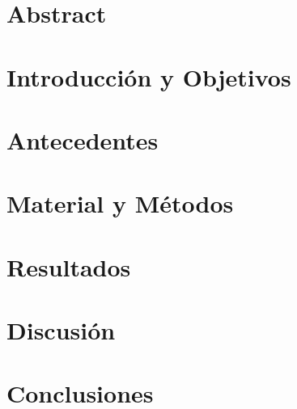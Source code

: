 \documentclass[b5paper,twoside,10pt]{book}
\begin{document}
\tableofcontents
\listoffigures
\listoftables
\clearpage



\mainmatter

\pagestyle{fancy}
\lhead{\uppercase{\bfseries{\leftmark}}}
\rhead{\uppercase{\bfseries{\rightmark}}}
\fancyhead[LO]{\bfseries{}}
\fancyhead[RE]{\bfseries{}}
\cfoot{\thepage}
\renewcommand{\headrulewidth}{0,2pt}
\chapter{Abstract}


\chapter{Introducción y Objetivos}


\chapter{Antecedentes}


\chapter{Material y Métodos}


\chapter{Resultados}


\chapter{Discusión}


\chapter{Conclusiones}



\begin{singlespace}
	\begin{footnotesize}
		\begin{twocolumn}

\end{twocolumn}
\end{footnotesize}
\end{singlespace}
\end{document}
